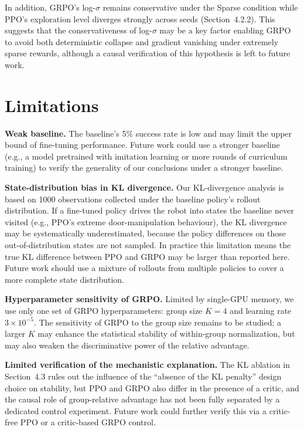 In addition, GRPO's log-$\sigma$ remains conservative under the Sparse condition while PPO's exploration level diverges strongly across seeds (Section~4.2.2). This suggests that the conservativeness of log-$\sigma$ may be a key factor enabling GRPO to avoid both deterministic collapse and gradient vanishing under extremely sparse rewards, although a causal verification of this hypothesis is left to future work.

\section{Limitations}

\textbf{Weak baseline.} The baseline's 5\% success rate is low and may limit the upper bound of fine-tuning performance. Future work could use a stronger baseline (e.g., a model pretrained with imitation learning or more rounds of curriculum training) to verify the generality of our conclusions under a stronger baseline.

\textbf{State-distribution bias in KL divergence.} Our KL-divergence analysis is based on 1000 observations collected under the baseline policy's rollout distribution. If a fine-tuned policy drives the robot into states the baseline never visited (e.g., PPO's extreme door-manipulation behaviour), the KL divergence may be systematically underestimated, because the policy differences on those out-of-distribution states are not sampled. In practice this limitation means the true KL difference between PPO and GRPO may be larger than reported here. Future work should use a mixture of rollouts from multiple policies to cover a more complete state distribution.

\textbf{Hyperparameter sensitivity of GRPO.} Limited by single-GPU memory, we use only one set of GRPO hyperparameters: group size $K=4$ and learning rate $3\times10^{-5}$. The sensitivity of GRPO to the group size remains to be studied; a larger $K$ may enhance the statistical stability of within-group normalization, but may also weaken the discriminative power of the relative advantage.

\textbf{Limited verification of the mechanistic explanation.} The KL ablation in Section~4.3 rules out the influence of the ``absence of the KL penalty'' design choice on stability, but PPO and GRPO also differ in the presence of a critic, and the causal role of group-relative advantage has not been fully separated by a dedicated control experiment. Future work could further verify this via a critic-free PPO or a critic-based GRPO control.

